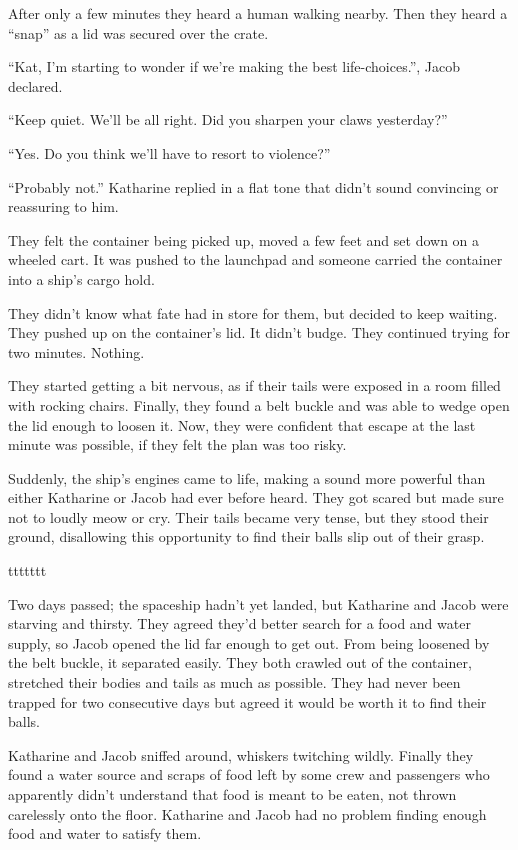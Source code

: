 After only a few minutes they heard a human walking nearby. Then they heard a “snap” as a lid was secured over the crate.

“Kat, I'm starting to wonder if we're making the best life-choices.”, Jacob declared.

“Keep quiet. We'll be all right. Did you sharpen your claws yesterday?”

“Yes. Do you think we'll have to resort to violence?”

“Probably not.” Katharine replied in a flat tone that didn't sound convincing or reassuring to him.

They felt the container being picked up, moved a few feet and set down on a wheeled cart. It was pushed to the launchpad and someone carried the container into a ship's cargo hold.

They didn't know what fate had in store for them, but decided to keep waiting. They pushed up on the container's lid. It didn't budge. They continued trying for two minutes. Nothing.

They started getting a bit nervous, as if their tails were exposed in a room filled with rocking chairs. Finally, they found a belt buckle and was able to wedge open the lid enough to loosen it. Now, they were confident that escape at the last minute was possible, if they felt the plan was too risky.

Suddenly, the ship's engines came to life, making a sound more powerful than either Katharine or Jacob had ever before heard. They got scared but made sure not to loudly meow or cry. Their tails became very tense, but they stood their ground, disallowing this opportunity to find their balls slip out of their grasp.



ttttttt



Two days passed; the spaceship hadn't yet landed, but Katharine and Jacob were starving and thirsty. They agreed they'd better search for a food and water supply, so Jacob opened the lid far enough to get out. From being loosened by the belt buckle, it separated easily. They both crawled out of the container, stretched their bodies and tails as much as possible. They had never been trapped for two consecutive days but agreed it would be worth it to find their balls.

Katharine and Jacob sniffed around, whiskers twitching wildly. Finally they found a water source and scraps of food left by some crew and passengers who apparently didn't understand that food is meant to be eaten, not thrown carelessly onto the floor. Katharine and Jacob had no problem finding enough food and water to satisfy them.

